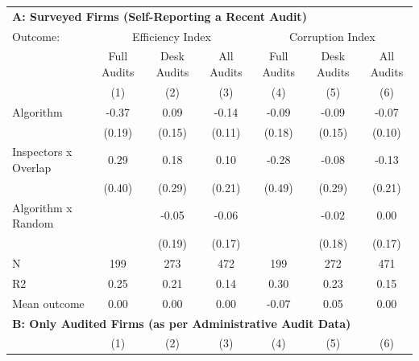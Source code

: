 \begin{tabular}{lccc|ccc} \toprule
\multicolumn{7}{l}{\textbf{A: Surveyed Firms (Self-Reporting a Recent Audit)}} \\ \multicolumn{1}{l}{Outcome:} & \multicolumn{3}{c}{Efficiency Index} & \multicolumn{3}{c}{Corruption Index} \\ \multicolumn{1}{l}{} & Full Audits & Desk Audits & All Audits & Full Audits & Desk Audits & All Audits \\ \multicolumn{1}{l}{} & (1) & (2) & (3) & (4) & (5) & (6) \\ \midrule
Algorithm   &       -0.37\sym{*}  &        0.09         &       -0.14         &       -0.09         &       -0.09         &       -0.07         \\
            &      (0.19)         &      (0.15)         &      (0.11)         &      (0.18)         &      (0.15)         &      (0.10)         \\
\addlinespace
Inspectors x Overlap&        0.29         &        0.18         &        0.10         &       -0.28         &       -0.08         &       -0.13         \\
            &      (0.40)         &      (0.29)         &      (0.21)         &      (0.49)         &      (0.29)         &      (0.21)         \\
\addlinespace
Algorithm x Random&                     &       -0.05         &       -0.06         &                     &       -0.02         &        0.00         \\
            &                     &      (0.19)         &      (0.17)         &                     &      (0.18)         &      (0.17)         \\
\midrule
N           &         199         &         273         &         472         &         199         &         272         &         471         \\
R2          &        0.25         &        0.21         &        0.14         &        0.30         &        0.23         &        0.15         \\
Mean outcome&        0.00         &        0.00         &        0.00         &       -0.07         &        0.05         &        0.00         \\

\midrule \multicolumn{7}{l}{\textbf{B: Only Audited Firms (as per Administrative Audit Data)}} \\ \multicolumn{1}{l}{} & (1) & (2) & (3) & (4) & (5) & (6) \\ \midrule


\end{tabular}
